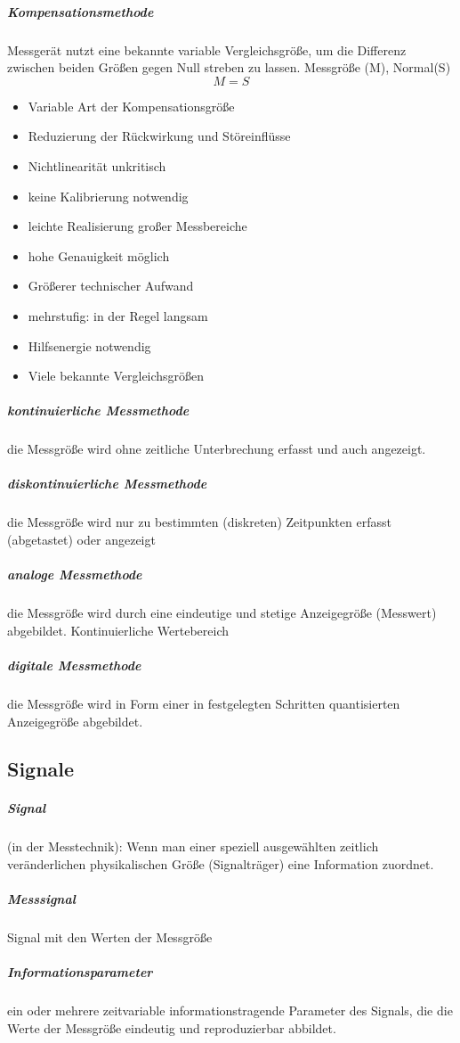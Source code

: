 \documentclass[a4paper]{scrartcl}
\begin{document}
\subparagraph{Kompensationsmethode} Messgerät nutzt eine bekannte variable Vergleichsgröße, um die Differenz zwischen beiden Größen gegen Null streben zu lassen. Messgröße (M), Normal(S) %
\[M=S\]
\begin{itemize}
\item Variable Art der Kompensationsgröße
\item Reduzierung der Rückwirkung und Störeinflüsse
\item Nichtlinearität unkritisch
\item keine Kalibrierung notwendig
\item leichte Realisierung großer Messbereiche
\item hohe Genauigkeit möglich

\item Größerer technischer Aufwand
\item mehrstufig: in der Regel langsam
\item Hilfsenergie notwendig
\item Viele bekannte Vergleichsgrößen
\end{itemize}

\subparagraph{kontinuierliche Messmethode} die Messgröße wird ohne zeitliche Unterbrechung erfasst und auch angezeigt.

\subparagraph{diskontinuierliche Messmethode} die Messgröße wird nur zu bestimmten (diskreten) Zeitpunkten erfasst (abgetastet) oder angezeigt

\subparagraph{analoge Messmethode} die Messgröße wird durch eine eindeutige und stetige Anzeigegröße (Messwert) abgebildet. Kontinuierliche Wertebereich

\subparagraph{digitale Messmethode} die Messgröße wird in Form einer in festgelegten Schritten quantisierten Anzeigegröße abgebildet.

\subsection{Signale}
\subparagraph{Signal} (in der Messtechnik): Wenn man einer speziell ausgewählten zeitlich veränderlichen physikalischen Größe (Signalträger) eine Information zuordnet.

\subparagraph{Messsignal} Signal mit den Werten der Messgröße

\subparagraph{Informationsparameter} ein oder mehrere zeitvariable informationstragende Parameter des Signals, die die Werte der Messgröße eindeutig und reproduzierbar abbildet.
\end{document}
